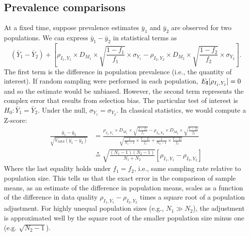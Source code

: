 \documentclass[11pt]{amsart}
\def\I{\bf I}
\begin{document}
\subsection{Prevalence comparisons}

At a fixed time, suppose prevalence estimates $\bar y_1$ and $\bar y_2$ are observed for two populations. We can express $\bar y_1 - \bar y_2$ in statistical terms as
$$
(\bar Y_1 - \bar Y_2) + \left[ \rho_{I_1, Y_1} \times D_{M_1} \times \sqrt{\frac{1-f_1}{f_1}} \times \sigma_{Y_1}  - \rho_{I_2, Y_2} \times D_{M_2} \times \sqrt{\frac{1-f_2}{f_2}} \times \sigma_{Y_2} \right].
$$
The first term is the difference in population prevalence (i.e., the quantity of interest).  If random sampling were performed in each population, $E_{\I} [ \rho_{I_j, Y_j}] = 0$ and so the estimate would be unbiased.  However, the second term represents the complex error that results from selection bias.
The particular test of interest is $H_0: \bar Y_1 = \bar Y_2$.  Under the null, $\sigma_{Y_1} = \sigma_{Y_2}$.  In classical statistics, we would compute a Z-score:
$$
\begin{aligned}
\frac{\bar y_1 - \bar y_2}{ \sqrt{V_{SRS} (\bar y_1 - \bar y_2)} } &=
\frac{\rho_{I_1, Y_1} \times D_{M_1} \times \sqrt{\frac{1-f_1}{f_1}}  - \rho_{I_2, Y_2} \times D_{M_2} \times \sqrt{\frac{1-f_2}{f_2}} }{ \sqrt{\frac{1}{N_1 -1} \times \frac{1-f_1}{f_1} + \frac{1}{N_2 - 1} \times \frac{1-f_2}{f_2}} }  \\
&\overset{\star}{=}
\sqrt{\frac{(N_1-1)(N_2 -1)}{N_1 + N_2}} \left[ \rho_{I_1, Y_1} - \rho_{I_2, Y_2} \right]
\end{aligned}
$$
Where the last equality holds under $f_1 = f_2$, i.e., same sampling rate relative to population size. This tells us that the exact error in the comparison of sample means, as an estimate of the difference in population means, scales as a function of the difference in data quality $\rho_{I_1, Y_1} - \rho_{I_2, Y_2}$ times a square root of a population adjustment.  For highly unequal population sizes (e.g., $N_1 \gg N_2$), the adjustment is approximated well by the square root of the smaller population size minus one (e.g. $\sqrt{N_2 -1}$).
\end{document}
